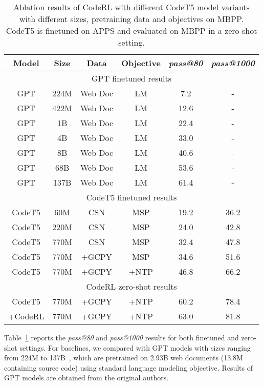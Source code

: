 \documentclass{article}
\begin{document}
\begin{table}[t]
\end{table} \begin{table}[t]
\centering
\caption{Ablation results of CodeRL with different CodeT5 model variants with different sizes, pretraining data and objectives on MBPP. CodeT5 is finetuned on APPS and evaluated on MBPP in a zero-shot setting.}\label{tab:mbpp}
\begin{tabular}{cc|cc|cc}
\hline
Model & Size & Data & Objective & \emph{pass@80} & \emph{pass@1000} \\    
\hline
\multicolumn{6}{c}{\cellcolor[HTML]{EFEFEF} GPT finetuned results} \\
\hline
GPT & 224M & Web Doc   & LM     & 7.2 &- \\ 
GPT & 422M & Web Doc   & LM     & 12.6 &-\\ 
GPT & 1B & Web Doc   & LM   & 22.4 &-\\       
GPT & 4B & Web Doc   & LM     & 33.0 &-\\   
GPT & 8B & Web Doc   & LM     & 40.6 &-\\   
GPT & 68B & Web Doc   & LM    & 53.6 &-\\   
GPT & 137B & Web Doc   & LM      & 61.4 &-\\   
\hline
\multicolumn{6}{c}{\cellcolor[HTML]{EFEFEF} CodeT5 finetuned results} \\
\hline
  
CodeT5 & 60M     & CSN       & MSP          & 19.2 & 36.2\\
CodeT5 &220M      & CSN     & MSP         & 24.0 &42.8\\
CodeT5 &770M        & CSN       & MSP         & 32.4& 47.8\\
CodeT5 &770M   & +GCPY    & MSP         & 34.6        &51.6\\
CodeT5 &770M       & +GCPY     & +NTP      & 46.8 &66.2\\
\hline
\multicolumn{6}{c}{\cellcolor[HTML]{EFEFEF} CodeRL zero-shot results} \\
\hline
CodeT5 &770M       & +GCPY      & +NTP       & 60.2&78.4\\
+CodeRL &770M       & +GCPY      & +NTP       & 63.0 &81.8\\
\hline
\end{tabular}
\end{table} 
Table~\ref{tab:mbpp} reports the  \emph{pass@80} and  \emph{pass@1000} results for both finetuned and zero-shot settings.  For baselines, we compared with GPT models with sizes ranging from 224M to 137B~\citep{austin2021program}, which are pretrained on 2.93B web documents (13.8M containing source code) using standard language modeling objective.  Results of GPT models are obtained from the original authors.
\end{document}
